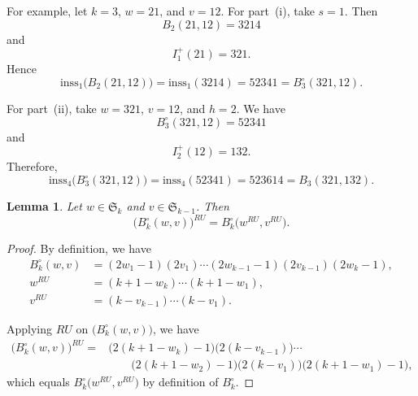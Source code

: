\documentclass[12pt]{amsart}
\newtheorem{lem}[thm]{Lemma}
\theoremstyle{definition}
\numberwithin{equation}{section}
\newcommand{\inss}[1]{\mathrm{inss}_{#1}}
\begin{document}
For example, let $k=3$, $w=21$, and $v=12$. For part~(i), take
$s=1$. Then
\begin{equation*}
B_2(21,12)=3214
\end{equation*}
and
\begin{equation*}
I_1^+(21)=321.
\end{equation*}
Hence
\begin{equation*}
\inss{1}\bigl(B_2(21,12)\bigr)
=
\inss{1}(3214)
=
52341
=
B_3^\circ(321,12).
\end{equation*}

For part~(ii), take $w=321$, $v=12$, and $h=2$. We have
\begin{equation*}
B_3^\circ(321,12)=52341
\end{equation*}
and
\begin{equation*}
I_2^+(12)=132.
\end{equation*}
Therefore,
\begin{equation*}
\inss{4}\bigl(B_3^\circ(321,12)\bigr)
=
\inss{4}(52341)
=
523614
=
B_3(321,132).
\end{equation*}

\begin{lem}\label{l:B circ with RU}
Let $w\in\mathfrak{S}_k$ and $v\in\mathfrak{S}_{k-1}$. Then
\begin{equation*}
\bigl(B_k^\circ(w,v)\bigr)^{RU}
=
B_k^\circ\bigl(w^{RU},v^{RU}\bigr).
\end{equation*}
\end{lem}

\begin{proof}

By definition, we have
\begin{align*}
B_k^\circ(w,v)
&=
(2w_1-1)(2v_1)\cdots
(2w_{k-1}-1)(2v_{k-1})(2w_k-1), \\
w^{RU}
&=
(k+1-w_k)\cdots(k+1-w_1), \\
v^{RU}
&=
(k-v_{k-1})\cdots(k-v_1).
\end{align*}

Applying $RU$ on $\bigl(B_k^\circ(w,v)\bigr)$, we have
\begin{align*}
\bigl(B_k^\circ(w,v)\bigr)^{RU}
={}&
\bigl(2(k+1-w_k)-1\bigr)
\bigl(2(k-v_{k-1})\bigr)\cdots\\
&\qquad
\bigl(2(k+1-w_2)-1\bigr)
\bigl(2(k-v_1)\bigr)
\bigl(2(k+1-w_1)-1\bigr),
\end{align*}
which equals
$B_k^\circ\bigl(w^{RU},v^{RU}\bigr)$ by definition of $B_k^\circ$.

\end{proof}
\end{document}
